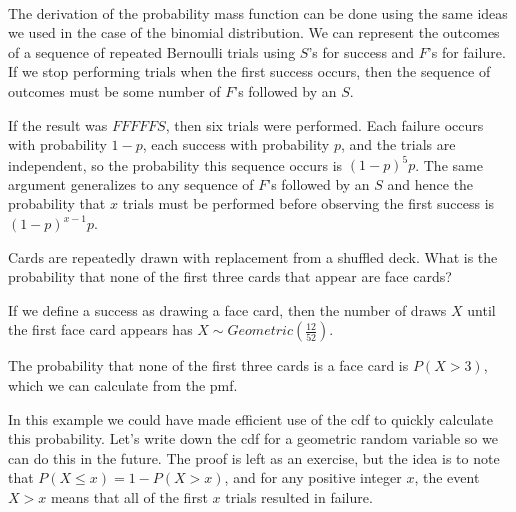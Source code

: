\begin{center}
 \ \ \  
\end{center}
\par
The derivation of the probability mass function can be done using the same ideas we used in the case of the binomial distribution. We can represent the outcomes of a sequence of repeated Bernoulli trials using $S$'s for success and $F$'s for failure. If we stop performing trials when the first success occurs, then the sequence of outcomes must be some number of $F$'s followed by an $S$.
\par
If the result was $FFFFFS$, then six trials were performed. Each failure occurs with probability $1-p$, each success with probability $p$, and the trials are independent, so the probability this sequence occurs is $(1-p)^5p$. The same argument generalizes to any sequence of $F$'s followed by an $S$ and hence the probability that $x$ trials must be performed before observing the first success is $(1-p)^{x-1}p$.
\par
\begin{examp}\label{GeoCards}Cards are repeatedly drawn with replacement from a shuffled deck. What is the probability that none of the first three cards that appear are face cards?
\par
\noindent If we define a success as drawing a face card, then the number of draws $X$ until the first face card appears has $X \sim Geometric(\frac{12}{52})$.
\par
\noindent
The probability that none of the first three cards is a face card is $P(X > 3)$, which we can calculate from the pmf.
\end{examp}
\par
In this example we could have made efficient use of the cdf to quickly calculate this probability. Let's write down the cdf for a geometric random variable so we can do this in the future. The proof is left as an exercise, but the idea is to note that $P(X \leq x) = 1 - P(X > x)$, and for any positive integer $x$, the event $X>x$ means that all of the first $x$ trials resulted in failure.

